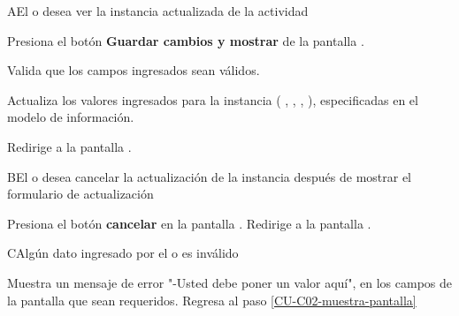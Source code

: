 \begin{UCtrayectoriaA}{A}{El  o  desea ver la instancia actualizada de la actividad}

    \Actor Presiona el botón {\bf Guardar cambios y mostrar} de la pantalla .

    \Sistema Valida que los campos ingresados sean válidos.  

    \Sistema Actualiza los valores ingresados para la instancia  (
      ,
      ,
      ,
      ), especificadas en el modelo de información.

    \Sistema Redirige a la pantalla .

\end{UCtrayectoriaA}

\begin{UCtrayectoriaA}%
  {B}{El  o  desea cancelar la actualización de la instancia después de mostrar el formulario de actualización}

  \Actor Presiona el botón {\bf cancelar} en la pantalla .
  \Sistema Redirige a la pantalla .

\end{UCtrayectoriaA}

\begin{UCtrayectoriaA}{C}{Algún dato ingresado por el  o  es inválido}

  \Sistema Muestra un mensaje de error "-Usted debe poner un valor aquí", en los campos de la pantalla  que sean requeridos.
  \Sistema Regresa al paso \ref{CU-C02-muestra-pantalla}

\end{UCtrayectoriaA}
